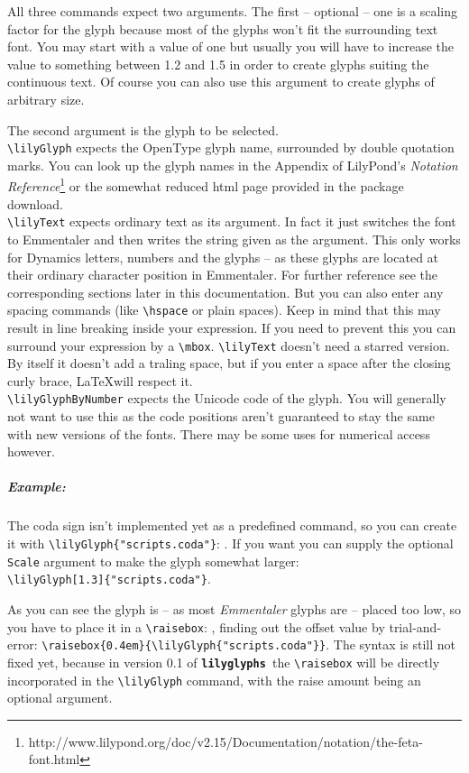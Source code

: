 \documentclass{article}
\newcommand{\lilyglyphs}{\texttt{\textbf{lilyglyphs\,}}}
\newcommand*{\cmd}[1]{\texttt{\textbackslash #1}}
\begin{document}
All three commands expect two arguments. The first -- optional -- one is a scaling factor for the glyph because most of the glyphs won't fit the surrounding text font. You may start with a value of one but usually you will have to increase the value to something between 1.2 and 1.5 in order to create glyphs suiting the continuous text. Of course you can also use this argument to create glyphs of arbitrary size. 

The second argument is the glyph to be selected.\\
\cmd{lilyGlyph} expects the OpenType glyph name, surrounded by double quotation marks. You can look up the glyph names in the Appendix of LilyPond's \emph{Notation Reference}\footnote{http://www.lilypond.org/doc/v2.15/Documentation/notation/the-feta-font.html} or the somewhat reduced html page provided in the package download.\\
\cmd{lilyText} expects ordinary text as its argument. In fact it just switches the font to Emmentaler and then writes the string given as the argument. This only works for Dynamics letters, numbers and the glyphs  -- as these glyphs are located at their ordinary character position in Emmentaler. For further reference see the corresponding sections later in this documentation. But you can also enter any spacing commands (like \cmd{hspace} or plain spaces). Keep in mind that this may result in line breaking inside your expression. If you need to prevent this you can surround your expression by a \cmd{mbox}. \cmd{lilyText} doesn't need a starred version. By itself it doesn't add a traling space, but if you enter a space after the closing curly brace, \LaTeX will respect it.\\ 
\cmd{lilyGlyphByNumber} expects the Unicode code of the glyph. You will generally not want to use this as the code positions aren't guaranteed to stay the same with new versions of the fonts. There may be some uses for numerical access however.


\subparagraph*{Example:}
The coda sign isn't implemented yet as a predefined command, so you can create it with \cmd{lilyGlyph\{"scripts.coda"\}}: . If you want you can supply the optional \texttt{Scale} argument to make the glyph somewhat larger: ~\\
\cmd{lilyGlyph[1.3]\{"scripts.coda"\}}.

As you can see the glyph is -- as most \emph{Emmentaler} glyphs are -- placed too low, so you have to place it in a  \cmd{raisebox}: , finding out the offset value by trial-and-error: \cmd{raisebox\{0.4em\}\{\textbackslash lilyGlyph\{"scripts.coda"\}\}}. The syntax is still not fixed yet, because in version 0.1 of \lilyglyphs the \cmd{raisebox} will be directly incorporated in the \cmd{lilyGlyph} command, with the raise amount being an optional argument.
\end{document}
